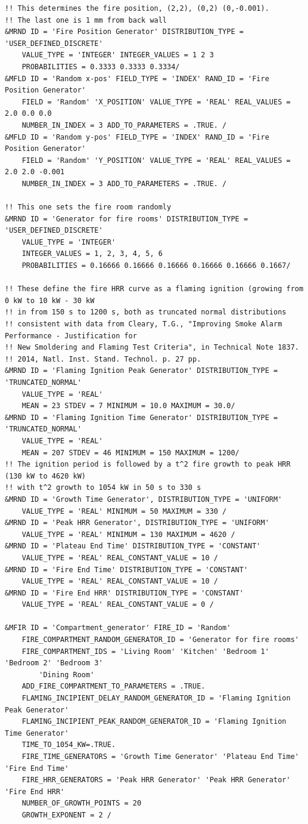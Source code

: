 \documentclass[12pt,twoside]{book}
\begin{document}
\begin{lstlisting}[basicstyle=\scriptsize]
!! This determines the fire position, (2,2), (0,2) (0,-0.001).
!! The last one is 1 mm from back wall
&MRND ID = 'Fire Position Generator' DISTRIBUTION_TYPE = 'USER_DEFINED_DISCRETE'
    VALUE_TYPE = 'INTEGER' INTEGER_VALUES = 1 2 3
    PROBABILITIES = 0.3333 0.3333 0.3334/
&MFLD ID = 'Random x-pos' FIELD_TYPE = 'INDEX' RAND_ID = 'Fire Position Generator'
    FIELD = 'Random' 'X_POSITION' VALUE_TYPE = 'REAL' REAL_VALUES = 2.0 0.0 0.0
    NUMBER_IN_INDEX = 3 ADD_TO_PARAMETERS = .TRUE. /
&MFLD ID = 'Random y-pos' FIELD_TYPE = 'INDEX' RAND_ID = 'Fire Position Generator'
    FIELD = 'Random' 'Y_POSITION' VALUE_TYPE = 'REAL' REAL_VALUES = 2.0 2.0 -0.001
    NUMBER_IN_INDEX = 3 ADD_TO_PARAMETERS = .TRUE. /

!! This one sets the fire room randomly
&MRND ID = 'Generator for fire rooms' DISTRIBUTION_TYPE = 'USER_DEFINED_DISCRETE'
    VALUE_TYPE = 'INTEGER'
    INTEGER_VALUES = 1, 2, 3, 4, 5, 6
    PROBABILITIES = 0.16666 0.16666 0.16666 0.16666 0.16666 0.1667/
	
!! These define the fire HRR curve as a flaming ignition (growing from 0 kW to 10 kW - 30 kW
!! in from 150 s to 1200 s, both as truncated normal distributions
!! consistent with data from Cleary, T.G., "Improving Smoke Alarm Performance - Justification for
!! New Smoldering and Flaming Test Criteria", in Technical Note 1837.
!! 2014, Natl. Inst. Stand. Technol. p. 27 pp.
&MRND ID = 'Flaming Ignition Peak Generator' DISTRIBUTION_TYPE = 'TRUNCATED_NORMAL'
    VALUE_TYPE = 'REAL'
    MEAN = 23 STDEV = 7 MINIMUM = 10.0 MAXIMUM = 30.0/
&MRND ID = 'Flaming Ignition Time Generator' DISTRIBUTION_TYPE = 'TRUNCATED_NORMAL'
    VALUE_TYPE = 'REAL'
    MEAN = 207 STDEV = 46 MINIMUM = 150 MAXIMUM = 1200/
!! The ignition period is followed by a t^2 fire growth to peak HRR (130 kW to 4620 kW)
!! with t^2 growth to 1054 kW in 50 s to 330 s
&MRND ID = 'Growth Time Generator', DISTRIBUTION_TYPE = 'UNIFORM'
    VALUE_TYPE = 'REAL' MINIMUM = 50 MAXIMUM = 330 /
&MRND ID = 'Peak HRR Generator', DISTRIBUTION_TYPE = 'UNIFORM'
    VALUE_TYPE = 'REAL' MINIMUM = 130 MAXIMUM = 4620 /
&MRND ID = 'Plateau End Time' DISTRIBUTION_TYPE = 'CONSTANT'
    VALUE_TYPE = 'REAL' REAL_CONSTANT_VALUE = 10 /
&MRND ID = 'Fire End Time' DISTRIBUTION_TYPE = 'CONSTANT'
    VALUE_TYPE = 'REAL' REAL_CONSTANT_VALUE = 10 /
&MRND ID = 'Fire End HRR' DISTRIBUTION_TYPE = 'CONSTANT'
    VALUE_TYPE = 'REAL' REAL_CONSTANT_VALUE = 0 /

&MFIR ID = 'Compartment_generator' FIRE_ID = 'Random'
    FIRE_COMPARTMENT_RANDOM_GENERATOR_ID = 'Generator for fire rooms'
    FIRE_COMPARTMENT_IDS = 'Living Room' 'Kitchen' 'Bedroom 1' 'Bedroom 2' 'Bedroom 3'
        'Dining Room'
    ADD_FIRE_COMPARTMENT_TO_PARAMETERS = .TRUE.
    FLAMING_INCIPIENT_DELAY_RANDOM_GENERATOR_ID = 'Flaming Ignition Peak Generator'
    FLAMING_INCIPIENT_PEAK_RANDOM_GENERATOR_ID = 'Flaming Ignition Time Generator'
	TIME_TO_1054_KW=.TRUE.
    FIRE_TIME_GENERATORS = 'Growth Time Generator' 'Plateau End Time' 'Fire End Time'
    FIRE_HRR_GENERATORS = 'Peak HRR Generator' 'Peak HRR Generator' 'Fire End HRR'
    NUMBER_OF_GROWTH_POINTS = 20
    GROWTH_EXPONENT = 2 /
\end{lstlisting}
\end{document}
